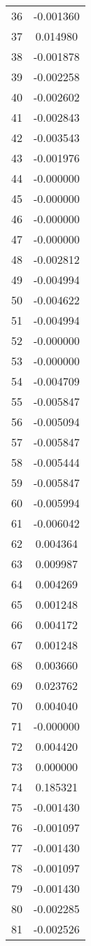 \documentclass[12pt]{article}
\begin{document}
\begin{longtable}{@{}cc@{}}
36 & -0.001360 \\
37 & 0.014980 \\
38 & -0.001878 \\
39 & -0.002258 \\
40 & -0.002602 \\
41 & -0.002843 \\
42 & -0.003543 \\
43 & -0.001976 \\
44 & -0.000000 \\
45 & -0.000000 \\
46 & -0.000000 \\
47 & -0.000000 \\
48 & -0.002812 \\
49 & -0.004994 \\
50 & -0.004622 \\
51 & -0.004994 \\
52 & -0.000000 \\
53 & -0.000000 \\
54 & -0.004709 \\
55 & -0.005847 \\
56 & -0.005094 \\
57 & -0.005847 \\
58 & -0.005444 \\
59 & -0.005847 \\
60 & -0.005994 \\
61 & -0.006042 \\
62 & 0.004364 \\
63 & 0.009987 \\
64 & 0.004269 \\
65 & 0.001248 \\
66 & 0.004172 \\
67 & 0.001248 \\
68 & 0.003660 \\
69 & 0.023762 \\
70 & 0.004040 \\
71 & -0.000000 \\
72 & 0.004420 \\
73 & 0.000000 \\
74 & 0.185321 \\
75 & -0.001430 \\
76 & -0.001097 \\
77 & -0.001430 \\
78 & -0.001097 \\
79 & -0.001430 \\
80 & -0.002285 \\
81 & -0.002526 \\

\end{longtable}
\end{document}
